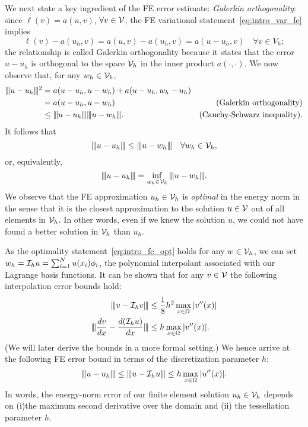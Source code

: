 We next state a key ingredient of the FE error estimate: \emph{Galerkin orthogonality}: since $\ell(v) = a(u,v)$, $\forall v \in \mathcal{V}$, the FE variational statement~\eqref{eq:intro_var_fe} implies
\begin{equation*}
  \ell(v) - a(u_h,v) = a(u,v) - a(u_h,v) = a(u-u_h,v) \quad \forall v \in V_h;
\end{equation*}
the relationship is called Galerkin orthogonality because it states that the error $u - u_h$ is orthogonal to the space $\mathcal{V}_h$ in the inner product $a(\cdot,\cdot)$. We now observe that, for any $w_h \in \mathcal{V}_h$,
\begin{align*}
  |\kern-1pt|\kern-1pt| u-u_h |\kern-1pt|\kern-1pt|^2
  &=
  a(u-u_h, u-w_h) + a(u-u_h,w_h - u_h)
  \\
  &=
  a(u-u_h, u - w_h) & \text{(Galerkin orthogonality)}
  \\
  &\leq  |\kern-1pt|\kern-1pt| u - u_h |\kern-1pt|\kern-1pt| |\kern-1pt|\kern-1pt| u - w_h |\kern-1pt|\kern-1pt|. & \text{(Cauchy-Schwarz inequality)}.
\end{align*}
It follows that
\begin{equation}
  |\kern-1pt|\kern-1pt| u - u_h |\kern-1pt|\kern-1pt| \leq |\kern-1pt|\kern-1pt| u - w_h |\kern-1pt|\kern-1pt| \quad \forall w_h \in \mathcal{V}_h,
  \label{eq:intro_fe_opt}
\end{equation}
or, equivalently,
\begin{equation*}
  |\kern-1pt|\kern-1pt| u-u_h |\kern-1pt|\kern-1pt| = \inf_{w_h \in \mathcal{V}_h} |\kern-1pt|\kern-1pt| u - w_h |\kern-1pt|\kern-1pt|.
\end{equation*}
We observe that the FE approximation $u_h \in \mathcal{V}_h$ is \emph{optimal} in the energy norm in the sense that it is the closest approximation to the solution $u \in \mathcal{V}$ out of all elements in $\mathcal{V}_h$.  In other words, even if we knew the solution $u$, we could not have found a better solution in $\mathcal{V}_h$ than $u_h$.

As the optimality statement~\eqref{eq:intro_fe_opt} holds for any $w \in \mathcal{V}_h$, we can set $w_h = \mathcal{I}_h u = \sum_{i=1}^N u(x_i) \phi_i$, the polynomial interpolant associated with our Lagrange basis functions.  It can be shown that for any $v \in \mathcal{V}$ the following interpolation error bounds hold:
\begin{align*}
  |\kern-1pt|\kern-1pt| v - \mathcal{I}_h v |\kern-1pt|\kern-1pt| &\leq \frac{1}{8} h^2 \max_{x \in \Omega} |v''(x)| \\
  |\kern-1pt|\kern-1pt| \frac{d v}{d x} - \frac{d (\mathcal{I}_h u)}{d x} |\kern-1pt|\kern-1pt| &\leq h \max_{x \in \Omega} |v''(x)| .
\end{align*}
(We will later derive the bounds in a more formal setting.) We hence arrive at the following FE error bound in terms of the discretization parameter $h$:
\begin{equation*}
  |\kern-1pt|\kern-1pt| u - u_h |\kern-1pt|\kern-1pt| \leq |\kern-1pt|\kern-1pt| u - \mathcal{I}_h u |\kern-1pt|\kern-1pt| \leq h \max_{x \in \Omega}  | u''(x) |.
\end{equation*}
In words, the energy-norm error of our finite element solution $u_h \in \mathcal{V}_h$  depends on  (i)the maximum second derivative over the domain and (ii) the tessellation parameter $h$.

